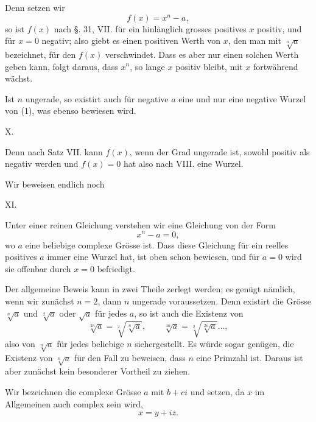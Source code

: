 
Denn setzen wir
\begin{equation}
 f(x)=x^n-a,
\tag{1}
\end{equation}
so ist $f(x)$ nach §. 31, VII. für ein hinlänglich grosses positives $x$ positiv, und für $x=0$ negativ; also giebt es einen positiven Werth von $x$, den man mit $\sqrt[n]{a}$ bezeichnet, für den $f(x)$ verschwindet. Dass es aber nur einen solchen Werth geben kann, folgt daraus, dass $x^n$, so lange $x$ positiv bleibt, mit $x$ fortwährend wächst.

Ist $n$ ungerade, so existirt auch für negative $a$ eine und nur eine negative Wurzel von (1), was ebenso bewiesen wird.

\medskip
\noindent X. 
\medskip

Denn nach Satz VII. kann $f(x)$, wenn der Grad ungerade ist, sowohl positiv als negativ werden und $f(x)=0$ hat also nach VIII. eine Wurzel.

Wir beweisen endlich noch

\medskip
\noindent XI. 
\medskip

Unter einer reinen Gleichung verstehen wir eine Gleichung von der Form
\begin{equation}
 x^n-a=0,
\tag{2}
\end{equation}
wo $a$ eine beliebige complexe Grösse ist. Dass diese Gleichung für ein reelles positives $a$ immer eine Wurzel hat, ist oben schon bewiesen, und für $a=0$ wird sie offenbar durch $x=0$ befriedigt.

Der allgemeine Beweis kann in zwei Theile zerlegt werden; es genügt nämlich, wenn wir zunächst $n=2$, dann $n$ ungerade voraussetzen. Denn existirt die Grösse $\sqrt[n]{a}$ und $\sqrt[2]{a}$ oder $\sqrt{a}$ für jedes $a$, so ist auch die Existenz von
\[
 \sqrt[2n]{a}=\sqrt[2]{\sqrt[n]{a}},\qquad \sqrt[4n]{a}=\sqrt[2]{\sqrt[2n]{a}}\ldots,
\]
also von $\sqrt[n]{a}$ für jedes beliebige $n$ sichergestellt. Es würde sogar genügen, die Existenz von $\sqrt[n]{a}$ für den Fall zu beweisen, dass $n$ eine Primzahl ist. Daraus ist aber zunächst kein besonderer Vortheil zu ziehen.

Wir bezeichnen die complexe Grösse $a$ mit $b+ci$ und setzen, da $x$ im Allgemeinen auch complex sein wird,
\[
 x=y+iz.
\]
